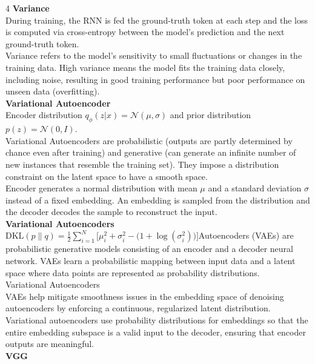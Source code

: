 \documentclass[8pt]{extarticle}
\begin{document}
\begin{multicols}{4}
{\vspace{2pt}\textbf{Variance}\\
During training, the RNN is fed the ground-truth token at each step and the loss is computed via cross-entropy between the model's prediction and the next ground-truth token.\\
Variance refers to the model's sensitivity to small fluctuations or changes in the training data. High variance means the model fits the training data closely, including noise, resulting in good training performance but poor performance on unseen data (overfitting).\\
\vspace{2pt}\textbf{Variational Autoencoder}\\
Encoder distribution $q_{\phi}(z|x) = \mathcal{N}(\mu, \sigma)$ and prior distribution $p(z) = \mathcal{N}(0, I)$.\\
Variational Autoencoders are probabilistic (outputs are partly determined by chance even after training) and generative (can generate an infinite number of new instances that resemble the training set). They impose a distribution constraint on the latent space to have a smooth space.\\
Encoder generates a normal distribution with mean $\mu$ and a standard deviation $\sigma$ instead of a fixed embedding. An embedding is sampled from the distribution and the decoder decodes the sample to reconstruct the input.\\
\vspace{2pt}\textbf{Variational Autoencoders}\\
$\text{DKL}(p\|q) = \frac{1}{2} \sum_{i=1}^{N} \big[\mu_i^{2} + \sigma_i^{2} - \big(1 + \log(\sigma_i^{2})\big)\big]$\Variational Autoencoders (VAEs) are probabilistic generative models consisting of an encoder and a decoder neural network. VAEs learn a probabilistic mapping between input data and a latent space where data points are represented as probability distributions.\\
Variational Autoencoders\\
VAEs help mitigate smoothness issues in the embedding space of denoising autoencoders by enforcing a continuous, regularized latent distribution.\\
Variational autoencoders use probability distributions for embeddings so that the entire embedding subspace is a valid input to the decoder, ensuring that encoder outputs are meaningful.\\
\vspace{2pt}\textbf{VGG}\\
}
\end{multicols}
\end{document}

